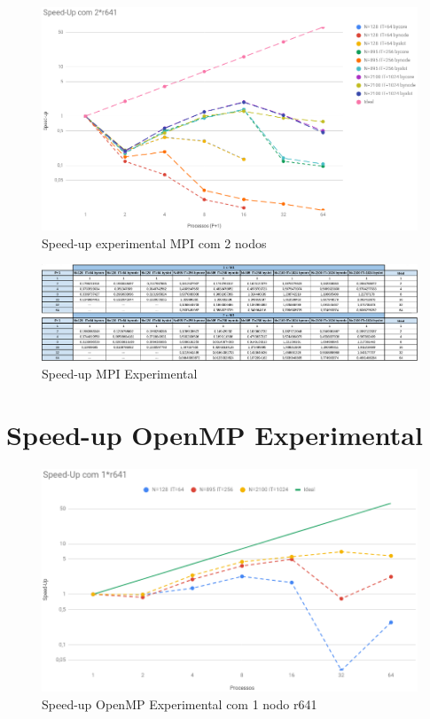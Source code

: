 \documentclass{article}
\begin{document}
\begin{appendices}
\begin{figure}[H]
    \centering
    \includegraphics[width=16cm]{Pictures/ExperimentalGraph2.png}
    \caption{Speed-up experimental MPI com 2 nodos}
\end{figure}

\label{speedup_tbl}
\begin{figure}[H]
    \centering
    \includegraphics[width=19cm]{Pictures/ExperimentalTable.png}
    \caption{Speed-up MPI Experimental}
\end{figure}

\section{Speed-up OpenMP Experimental}
\label{mp_speedup_graph}
\begin{figure}[H]
    \centering
    \includegraphics[width=16cm]{Pictures/OpenMP1.png}
    \caption{Speed-up OpenMP Experimental com 1 nodo r641}
\end{figure}


\end{appendices}
\end{document}
